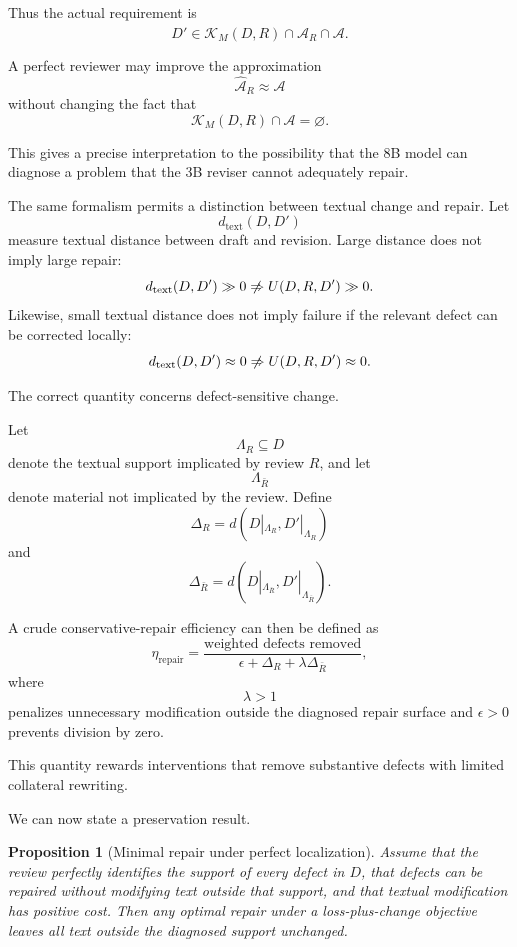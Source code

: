 \documentclass[11pt]{article}
\newtheorem{proposition}[definition]{Proposition}
\begin{document}
Thus the actual requirement is
\[
    D'
    \in
    \mathcal{K}_M(D,R)
    \cap
    \widehat{\mathcal{A}}_R
    \cap
    \mathcal{A}.
\]

A perfect reviewer may improve the approximation
\[
    \widehat{\mathcal{A}}_R\approx\mathcal{A}
\]
without changing the fact that
\[
    \mathcal{K}_M(D,R)\cap\mathcal{A}
    =
    \varnothing.
\]

This gives a precise interpretation to the possibility that the 8B model can diagnose a problem that the 3B reviser cannot adequately repair.

The same formalism permits a distinction between textual change and repair. Let
\[
    d_{\mathrm{text}}(D,D')
\]
measure textual distance between draft and revision. Large distance does not imply large repair:
\[
    d_{\mathrm{text}}(D,D')\gg0
    \centernot\Rightarrow
    U(D,R,D')\gg0.
\]
Likewise, small textual distance does not imply failure if the relevant defect can be corrected locally:
\[
    d_{\mathrm{text}}(D,D')\approx0
    \centernot\Rightarrow
    U(D,R,D')\approx0.
\]

The correct quantity concerns defect-sensitive change.

Let
\[
    \Lambda_R\subseteq D
\]
denote the textual support implicated by review \(R\), and let
\[
    \Lambda_{\bar R}
\]
denote material not implicated by the review. Define
\[
    \Delta_R
    =
    d(D|_{\Lambda_R},D'|_{\Lambda_R})
\]
and
\[
    \Delta_{\bar R}
    =
    d(D|_{\Lambda_{\bar R}},D'|_{\Lambda_{\bar R}}).
\]

A crude conservative-repair efficiency can then be defined as
\[
    \eta_{\mathrm{repair}}
    =
    \frac{
        \text{weighted defects removed}
    }{
        \epsilon
        +
        \Delta_R
        +
        \lambda\Delta_{\bar R}
    },
\]
where
\[
    \lambda>1
\]
penalizes unnecessary modification outside the diagnosed repair surface and \(\epsilon>0\) prevents division by zero.

This quantity rewards interventions that remove substantive defects with limited collateral rewriting.

We can now state a preservation result.

\begin{proposition}[Minimal repair under perfect localization]
Assume that the review perfectly identifies the support of every defect in \(D\), that defects can be repaired without modifying text outside that support, and that textual modification has positive cost. Then any optimal repair under a loss-plus-change objective leaves all text outside the diagnosed support unchanged.
\end{proposition}
\end{document}
